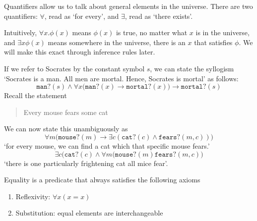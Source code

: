 \message{ !name(truth.tex)}\documentclass{scrbook}
\renewcommand{\implies}{\to}
\renewcommand{\iff}{\leftrightarrow}
\begin{document}
\begin{defn}[quantifier]
  Quantifiers allow us to talk about general elements in the universe. There are two quantifiers: $\forall$, read as `for every', and $\exists$, read as `there exists'.

  Intuitively, $\forall x .\phi(x)$ means $\phi(x)$ is true, no matter what $x$ is in the universe, and $\exists x \phi(x)$ means somewhere in the universe, there is an $x$ that satisfies $\phi$. We will make this exact through inference rules later.
\end{defn}
If we refer to Socrates by the constant symbol $s$, we can state the syllogism `Socrates is a man. All men are mortal. Hence, Socrates is mortal' as follows:
\[
\texttt{man?}(s) \wedge \forall x \bigl(\texttt{man?}(x)\implies\texttt{mortal?}(x)\bigr) \implies \texttt{mortal?}(s)
\] 
Recall the statement
\begin{quote}
  Every mouse fears some cat
\end{quote}
We can now state this unambiguously as 
\[
\forall m \bigr(\texttt{mouse?}(m) \implies \exists c (\texttt{cat?}(c)\wedge \texttt{fears?}(m,c)) \bigl)
\]
\ie `for every mouse, we can find a cat which that specific mouse fears.'
\[
\exists c \bigl(\texttt{cat?}(c) \wedge \forall m (\texttt{mouse?}(m) \texttt{fears?}(m,c)\bigr)
\]
\ie `there is one particularly frightening cat all mice fear'.

\begin{defn}[equality]
  Equality is a predicate that always satisfies the following axioms
  \begin{enumerate}
  \item Reflexivity: $\forall x (x=x)$
  \item Substitution: equal elements are interchangeable 
  \end{enumerate}
\end{defn}
\end{document}
